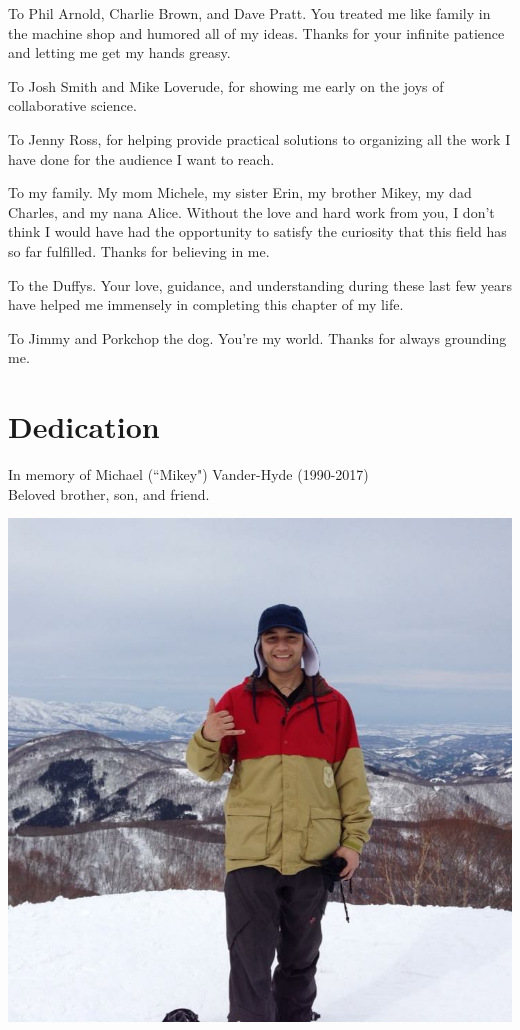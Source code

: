 \documentclass[12pt]{report}
\begin{document}
To Phil Arnold, Charlie Brown, and Dave Pratt. You treated me like family in the machine shop and humored all of my ideas. Thanks for your infinite patience and letting me get my hands greasy.

To Josh Smith and Mike Loverude, for showing me early on the joys of collaborative science.

To Jenny Ross, for helping provide practical solutions to organizing all the work I have done for the audience I want to reach. 

To my family. My mom Michele, my sister Erin, my brother Mikey, my dad Charles, and my nana Alice. Without the love and hard work from you, I don’t think I would have had the opportunity to satisfy the curiosity that this field has so far fulfilled. Thanks for believing in me.

To the Duffys. Your love, guidance, and understanding during these last few years have helped me immensely in completing this chapter of my life.

To Jimmy and Porkchop the dog. You’re my world. Thanks for always grounding me.


\chapter*{Dedication}
In memory of Michael (``Mikey") Vander-Hyde (1990-2017)
\\
Beloved brother, son, and friend.

\begin{center}
\includegraphics[width=.75\textwidth]{mikey.jpeg}
\end{center}
\end{document}
